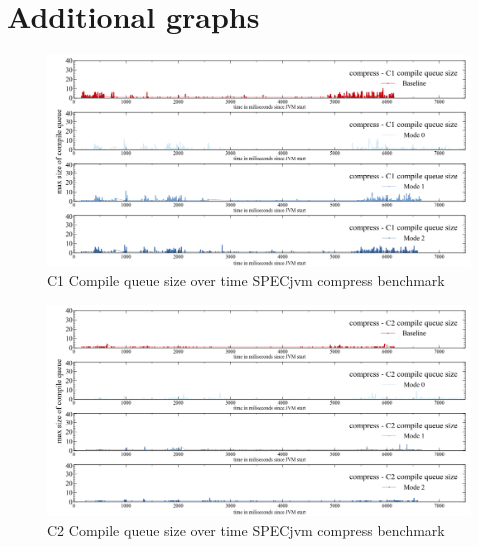\section{Additional graphs}
\label{a:additional_graphs}
\begin{figure}[ht]
  \begin{center}
    \centering
    \includegraphics[width=1.0\textwidth]{figures/spec_queue_compress_separate_c1.png}
    \caption{C1 Compile queue size over time SPECjvm compress benchmark}
    \label{f:spec_queue_compress_separate_c1}
  \end{center}
\end{figure}
\begin{figure}[ht]
  \begin{center}
    \centering
    \includegraphics[width=1.0\textwidth]{figures/spec_queue_compress_separate_c2.png}
    \caption{C2 Compile queue size over time SPECjvm compress benchmark}
    \label{f:spec_queue_compress_separate_c2}
  \end{center}
\end{figure}

